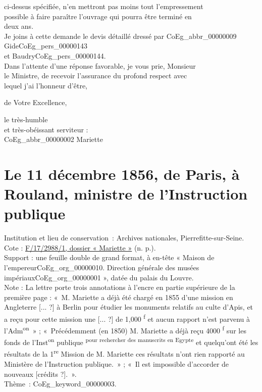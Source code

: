\documentclass{book}
\begin{document}
ci-dessus spécifiée, n’en mettront pas moins tout l’empressement\\
possible à faire paraître l’ouvrage qui pourra être terminé en\\
deux ans.\\
\indent Je joins à cette demande le devis détaillé dressé par \gls{CoEg_abbr_00000009} Gide\gls{CoEg_pers_00000143}\\
et Baudry\gls{CoEg_pers_00000144}.\\
\indent Dans l’attente d’une réponse favorable, je vous prie, Monsieur\\
le Ministre, de recevoir l’assurance du profond respect avec\\
lequel j’ai l’honneur d’être,\\
\begin{center}de Votre Excellence,\end{center}
\begin{center}\hspace{5cm}le très-humble\\
\hspace{5cm}et très-obéissant serviteur :\\
\hspace{5cm}\gls{CoEg_abbr_00000002} Mariette\end{center}

\hypertarget{CoEg_Mariette_1856-12-11}{}

\section*{Le 11 décembre 1856, de Paris, à Rouland, ministre de l’Instruction publique}
 \label{labCoEg_Mariette_1856-12-11}
{\footnotesize
\noindent Institution et lieu de conservation~: Archives nationales, Pierrefitte-sur-Seine.\\
Cote : \hyperlink{CoEg_Mariette_ms_002}{F/17/2988/1, dossier « Mariette »} (n. p.).\\
Support : une feuille double de grand format, à en-tête « Maison de l’empereur\gls{CoEg_org_00000010}. Direction générale des musées impériaux\gls{CoEg_org_00000001} », datée du palais du Louvre.\\
Note : La lettre porte trois annotations à l'encre en partie supérieure de la première page : «~M. Mariette a déjà été chargé en 1855 d’une mission en Angleterre [... ?] à Berlin pour étudier les monuments relatifs au culte d’Apis, et a reçu pour cette mission une [... ?] de 1,000 \textsuperscript{f} et aucun rapport n’est parvenu à l’Adm\textsuperscript{on}~» ; «~Précédemment (en 1850) M. Mariette a déjà reçu 4000 \textsuperscript{f} sur les fonds de l’Inst\textsuperscript{on} publique \textsuperscript{pour rechercher des manuscrits en Egypte} et quelqu’ont été les résultats de la 1\textsuperscript{re} Mission de M. Mariette ces résultats n’ont rien rapporté au Ministère de l’Instruction publique.~» ; «~Il est impossible d’accorder de nouveaux [crédits ?].~».\\
Thème~: \gls{CoEg_keyword_00000003}.}
\end{document}
